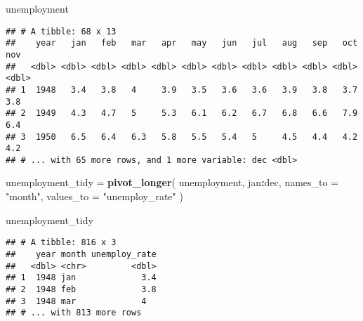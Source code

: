 \documentclass[]{article}
\newenvironment{Shaded}{\begin{snugshade}}{\end{snugshade}}
\newcommand{\DataTypeTok}[1]{\textcolor[rgb]{0.13,0.29,0.53}{#1}}
\newcommand{\KeywordTok}[1]{\textcolor[rgb]{0.13,0.29,0.53}{\textbf{#1}}}
\newcommand{\NormalTok}[1]{#1}
\newcommand{\OperatorTok}[1]{\textcolor[rgb]{0.81,0.36,0.00}{\textbf{#1}}}
\newcommand{\StringTok}[1]{\textcolor[rgb]{0.31,0.60,0.02}{#1}}
\begin{document}
\begin{Shaded}
\begin{Highlighting}[]
\NormalTok{unemployment}
\end{Highlighting}
\end{Shaded}

\begin{verbatim}
## # A tibble: 68 x 13
##    year   jan   feb   mar   apr   may   jun   jul   aug   sep   oct   nov
##   <dbl> <dbl> <dbl> <dbl> <dbl> <dbl> <dbl> <dbl> <dbl> <dbl> <dbl> <dbl>
## 1  1948   3.4   3.8   4     3.9   3.5   3.6   3.6   3.9   3.8   3.7   3.8
## 2  1949   4.3   4.7   5     5.3   6.1   6.2   6.7   6.8   6.6   7.9   6.4
## 3  1950   6.5   6.4   6.3   5.8   5.5   5.4   5     4.5   4.4   4.2   4.2
## # ... with 65 more rows, and 1 more variable: dec <dbl>
\end{verbatim}

\begin{Shaded}
\begin{Highlighting}[]
\NormalTok{unemployment_tidy =}\StringTok{ }
\StringTok{  }\KeywordTok{pivot_longer}\NormalTok{(}
\NormalTok{    unemployment,}
\NormalTok{    jan}\OperatorTok{:}\NormalTok{dec,}
    \DataTypeTok{names_to =} \StringTok{"month"}\NormalTok{,}
    \DataTypeTok{values_to =} \StringTok{"unemploy_rate"}
\NormalTok{  )}

\NormalTok{unemployment_tidy}
\end{Highlighting}
\end{Shaded}

\begin{verbatim}
## # A tibble: 816 x 3
##    year month unemploy_rate
##   <dbl> <chr>         <dbl>
## 1  1948 jan             3.4
## 2  1948 feb             3.8
## 3  1948 mar             4  
## # ... with 813 more rows
\end{verbatim}
\end{document}
